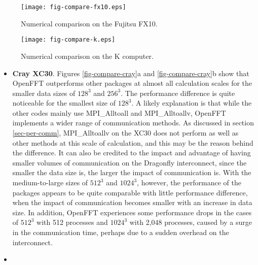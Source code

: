 \begin{figure}[htb]
\begin{center}
\texttt{[image: fig-compare-fx10.eps]}
\end{center}
\caption{Numerical comparison on the Fujitsu FX10.}
\label{fig-compare-fx10}
\end{figure}

\begin{figure}[htb]
\begin{center}
\texttt{[image: fig-compare-k.eps]}
\end{center}
\caption{Numerical comparison on the K computer.}
\label{fig-compare-k}
\end{figure}

\begin{itemize}
\item
\textbf{Cray XC30}. Figures \ref{fig-compare-cray}a and \ref{fig-compare-cray}b show that OpenFFT outperforms other packages at almost all calculation scales for the smaller data sizes of $128^3$ and $256^3$. The performance difference is quite noticeable for the smallest size of $128^3$. A likely explanation is that while the other codes mainly use MPI\_Alltoall and MPI\_Alltoallv, OpenFFT implements a wider range of communication methods. As discussed in section \ref{sec-per-comm}, MPI\_Alltoallv on the XC30 does not perform as well as other methods at this scale of calculation, and this may be the reason behind the difference. It can also be credited to the impact and advantage of having smaller volumes of communication on the Dragonfly interconnect, since the smaller the data size is, the larger the impact of communication is. With the medium-to-large sizes of $512^3$ and $1024^3$, however, the performance of the packages appears to be quite comparable with little performance difference, when the impact of communication becomes smaller with an increase in data size. In addition, OpenFFT experiences some performance drops in the cases of $512^3$ with 512 processes and $1024^3$ with 2,048 processes, caused by a surge in the communication time, perhaps due to a sudden overhead on the interconnect.     
\item

\end{itemize}
